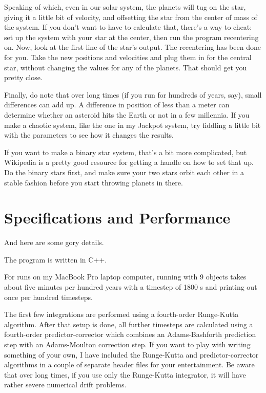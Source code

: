\documentclass{article}
\begin{document}
Speaking of which, even in our solar system, the planets will tug on the star, giving it a little bit of velocity, and offsetting the star from the center of mass of the system.  If you don't want to have to calculate that, there's a way to cheat: set up the system with your star at the center, then run the program recentering on.  Now, look at the first line of the star's output.  The recentering has been done for you.  Take the new positions and velocities and plug them in for the central star, without changing the values for any of the planets.  That should get you pretty close.

Finally, do note that over long times (if you run for hundreds of years, say), small differences can add up.  A difference in position of less than a meter can determine whether an asteroid hits the Earth or not in a few millennia.  If you make a chaotic system, like the one in my Jackpot system, try fiddling a little bit with the parameters to see how it changes the results.

If you want to make a binary star system, that's a bit more complicated, but Wikipedia is a pretty good resource for getting a handle on how to set that up.  Do the binary stars first, and make sure your two stars orbit each other in a stable fashion before you start throwing planets in there.

\section{Specifications and Performance}\label{sec:details}

And here are some gory details.

The program is written in C++.

For runs on my MacBook Pro laptop computer, running with 9 objects takes about five minutes per hundred years with a timestep of 1800 s and printing out once per hundred timesteps.

The first few integrations are performed using a fourth-order Runge-Kutta algorithm.  After that setup is done, all further timesteps are calculated using a fourth-order predictor-corrector which combines an Adams-Bashforth prediction step with an Adams-Moulton correction step.  If you want to play with writing something of your own, I have included the Runge-Kutta and predictor-corrector algorithms in a couple of separate header files for your entertainment.  Be aware that over long times, if you use only the Runge-Kutta integrator, it will have rather severe numerical drift problems.
\end{document}
